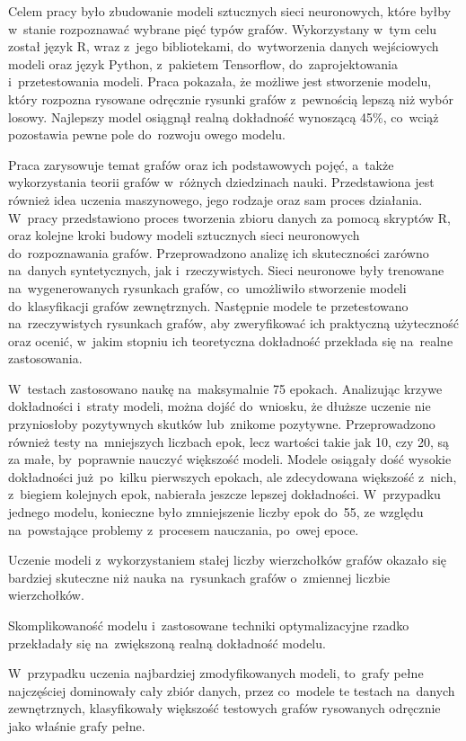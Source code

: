 Celem pracy było zbudowanie modeli sztucznych sieci neuronowych,
które byłby w~stanie rozpoznawać wybrane pięć typów grafów.
Wykorzystany w~tym celu został język R, wraz z~jego bibliotekami, do~wytworzenia danych wejściowych modeli
oraz język Python, z~pakietem Tensorflow, do~zaprojektowania i~przetestowania modeli.
Praca pokazała, że możliwe jest stworzenie modelu, który rozpozna rysowane odręcznie rysunki grafów
z~pewnością lepszą niż wybór losowy.
Najlepszy model osiągnął realną dokładność wynoszącą 45\%,
co~wciąż pozostawia pewne pole do~rozwoju owego modelu.

Praca zarysowuje temat grafów oraz ich podstawowych pojęć,
a~także wykorzystania teorii grafów w~różnych dziedzinach nauki.
Przedstawiona jest również idea uczenia maszynowego,
jego rodzaje oraz sam proces działania.
W~pracy przedstawiono proces tworzenia zbioru danych za pomocą skryptów R,
oraz kolejne kroki budowy modeli sztucznych sieci neuronowych do~rozpoznawania grafów.
Przeprowadzono analizę ich skuteczności zarówno na~danych syntetycznych, jak i~rzeczywistych.
Sieci neuronowe były trenowane na~wygenerowanych rysunkach grafów,
co~umożliwiło stworzenie modeli do~klasyfikacji grafów zewnętrznych.
Następnie modele te przetestowano na~rzeczywistych rysunkach grafów,
aby zweryfikować ich praktyczną użyteczność oraz ocenić,
w~jakim stopniu ich teoretyczna dokładność przekłada się na~realne zastosowania.

W~testach zastosowano naukę na~maksymalnie 75 epokach.
Analizując krzywe dokładności i~straty modeli, można dojść do~wniosku,
że dłuższe uczenie nie przyniosłoby pozytywnych skutków lub~znikome pozytywne.
Przeprowadzono również testy na~mniejszych liczbach epok, lecz wartości takie jak 10, czy 20,
są za małe, by~poprawnie nauczyć większość modeli.
Modele osiągały dość wysokie dokładności już~po~kilku pierwszych epokach,
ale zdecydowana większość z~nich, z~biegiem kolejnych epok, nabierała jeszcze lepszej dokładności.
W~przypadku jednego modelu, konieczne było zmniejszenie liczby epok do~55,
ze względu na~powstające problemy z~procesem nauczania, po~owej epoce.

Uczenie modeli z~wykorzystaniem stałej liczby wierzchołków grafów okazało się bardziej skuteczne
niż nauka na~rysunkach grafów o~zmiennej liczbie wierzchołków.

Skomplikowaność modelu i~zastosowane techniki optymalizacyjne rzadko przekładały się na~zwiększoną realną dokładność modelu.

W~przypadku uczenia najbardziej zmodyfikowanych modeli, to~grafy pełne najczęściej dominowały cały zbiór danych,
przez co~modele te testach na~danych zewnętrznych,
klasyfikowały większość testowych grafów rysowanych odręcznie jako właśnie grafy pełne.

